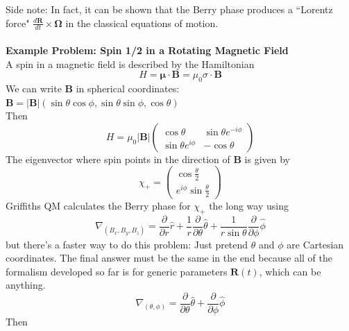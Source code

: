 \documentclass[a4paper,12pt]{article}
\renewcommand{\vec}[1]{\boldsymbol{\mathbf{#1}}}
\begin{document}
Side note: In fact, it can be shown that the Berry phase produces a ``Lorentz force" $\frac{d\vec{R}}{dt} \times \vec{\Omega}$ in the classical equations of motion.
\\ \\
\textbf{Example Problem: Spin 1/2 in a Rotating Magnetic Field} \\
A spin in a magnetic field is described by the Hamiltonian
\begin{equation}
H = \vec{\mu} \cdot\vec{B} = \mu_0 \sigma \cdot \vec{B}
\end{equation}
We can write $\vec{B}$ in spherical coordinates: $\vec{B} = |\vec{B}| (\sin\theta \cos\phi, \sin\theta \sin\phi, \cos\theta)$ \\
Then
\begin{equation}
H = \mu_0 |\vec{B}| \left(
\begin{matrix}
\cos{\theta} & \sin{\theta} e^{-i \phi}  \\
\sin{\theta} e^{i \phi} & -\cos{\theta}
\end{matrix}
\right)
\end{equation}
The eigenvector where spin points in the direction of $\vec{B}$ is given by
\begin{equation}
\chi_+ = \left(
\begin{matrix}
\cos{\frac{\theta}{2}} \\
e^{i \phi} \sin{\frac{\theta}{2}}
\end{matrix}
\right)
\end{equation}
Griffiths QM calculates the Berry phase for $\chi_+$ the long way using
\begin{equation}
\nabla_{(B_x,B_y,B_z)}=\frac{\partial}{\partial r} \hat{r} + \frac{1}{r} \frac{\partial}{\partial \theta} \hat{\theta} + \frac{1}{r \sin \theta} \frac{\partial}{\partial \phi} \hat{\phi}
\end{equation}
but there's a faster way to do this problem: Just pretend $\theta$ and $\phi$ are Cartesian coordinates.  The final answer must be the same in the end because all of the formalism developed so far is for generic parameters $\vec{R}(t)$, which can be anything.
\begin{equation}
\nabla_{(\theta, \phi)}=\frac{\partial}{\partial \theta} \hat{\theta} + \frac{\partial}{\partial \phi} \hat{\phi}
\end{equation}
Then
\end{document}

